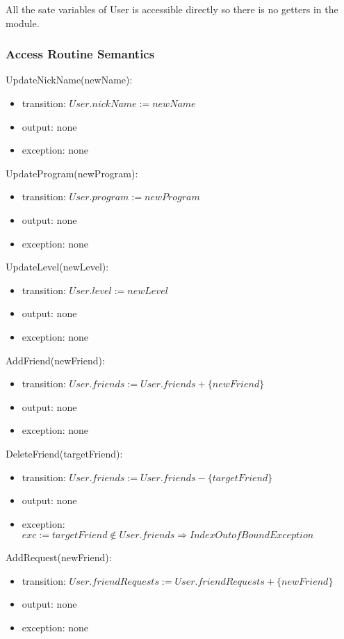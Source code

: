 \documentclass[12pt, titlepage]{article}
\begin{document}
All the sate variables of User is accessible directly so there is no getters in the module.

\subsubsection{Access Routine Semantics}

\noindent UpdateNickName(newName):
\begin{itemize}
\item transition: $User.nickName := newName$
\item output: none
\item exception: none
\end{itemize}

\noindent UpdateProgram(newProgram):
\begin{itemize}
\item transition: $User.program := newProgram$
\item output: none
\item exception: none
\end{itemize}

\noindent UpdateLevel(newLevel):
\begin{itemize}
\item transition: $User.level := newLevel$
\item output: none
\item exception: none
\end{itemize}

\noindent AddFriend(newFriend):
\begin{itemize}
\item transition: $User.friends := User.friends + \{newFriend\}$ 
\item output: none
\item exception: none
\end{itemize}

\noindent DeleteFriend(targetFriend):
\begin{itemize}
\item transition: $User.friends := User.friends - \{targetFriend\}$ 
\item output: none
\item exception: $exc := targetFriend \notin User.friends \Rightarrow IndexOutofBound Exception$
\end{itemize}

\noindent AddRequest(newFriend):
\begin{itemize}
\item transition: $User.friendRequests := User.friendRequests + \{newFriend\}$ 
\item output: none
\item exception: none
\end{itemize}
\end{document}
